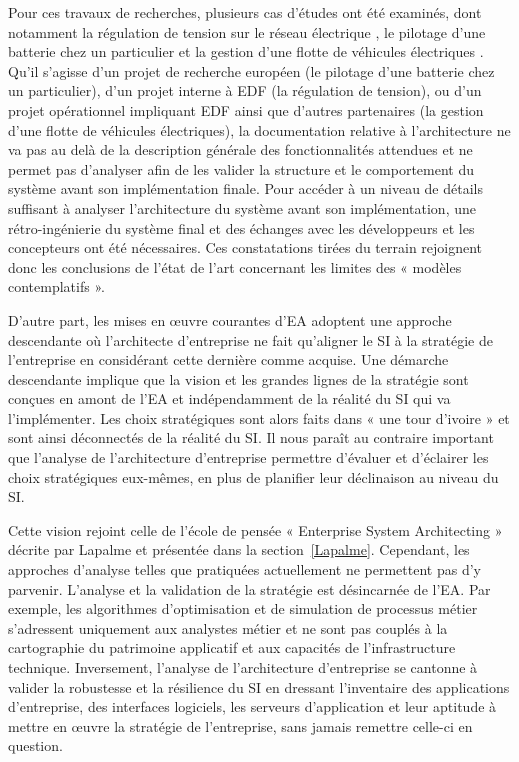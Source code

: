 	Pour ces travaux de recherches, plusieurs cas d'études ont été examinés, dont 
notamment la régulation de tension sur le réseau électrique 
\cite{seghiri2014simulation}, le pilotage d'une batterie chez un particulier 
\cite{seghiri2012animation} et la gestion d'une flotte de véhicules électriques 
\cite{seghiri2015simulation}. Qu'il s'agisse d'un projet de recherche européen 
(le pilotage d'une batterie chez un particulier), d'un projet interne à EDF (la 
régulation de tension), ou d'un projet opérationnel impliquant EDF ainsi que 
d'autres partenaires (la gestion d'une flotte de véhicules électriques), la 
documentation relative à l'architecture ne va pas au delà de la description 
générale des fonctionnalités attendues et ne permet pas d'analyser afin de les 
valider la structure et le comportement du système avant son implémentation 
finale. Pour accéder à un niveau de détails suffisant à analyser l'architecture 
du système avant son implémentation, une rétro-ingénierie du système final et 
des échanges avec les développeurs et les concepteurs ont été nécessaires. Ces 
constatations tirées du terrain rejoignent donc les conclusions de l'état de 
l'art concernant les limites des « modèles contemplatifs ».
	
	D'autre part, les mises en œuvre courantes d'EA adoptent une approche 
descendante où l'architecte d'entreprise ne fait qu'aligner le SI à la stratégie 
de l'entreprise en considérant cette dernière comme acquise. Une démarche 
descendante implique que la vision et les grandes lignes de la stratégie sont 
conçues en amont de l'EA et indépendamment de la réalité du SI qui va 
l'implémenter. Les choix stratégiques sont alors faits dans « une tour d'ivoire 
» et sont ainsi déconnectés de la réalité du SI. Il nous paraît au contraire 
important que l'analyse de l'architecture d'entreprise permettre d'évaluer et 
d'éclairer les choix stratégiques eux-mêmes, en plus de planifier leur 
déclinaison au niveau du SI. 
	
	Cette vision rejoint celle de l'école de pensée « Enterprise System 
Architecting » décrite par Lapalme \cite{lapalme2012three} et présentée dans la 
section~\ref{Lapalme}. Cependant, les approches d'analyse telles que pratiquées 
actuellement ne permettent pas d'y parvenir. L'analyse et la validation de la 
stratégie est désincarnée de l'EA. Par exemple, les algorithmes d'optimisation 
et de simulation de processus métier s'adressent uniquement aux analystes métier 
et ne sont pas couplés à la cartographie du patrimoine applicatif et aux 
capacités de l'infrastructure technique. Inversement, l'analyse de 
l'architecture d'entreprise se cantonne à valider la robustesse et la résilience 
du SI en dressant l'inventaire des applications d'entreprise, des interfaces 
logiciels, les serveurs d'application et leur aptitude à mettre en œuvre la 
stratégie de l'entreprise, sans jamais remettre celle-ci en question. 
	
